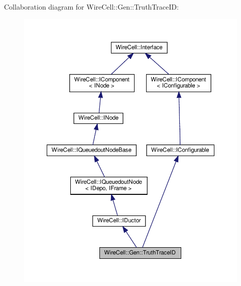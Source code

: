 Collaboration diagram for Wire\+Cell\+:\+:Gen\+:\+:Truth\+Trace\+ID\+:
\nopagebreak
\begin{figure}[H]
\begin{center}
\leavevmode
\includegraphics[width=350pt]{class_wire_cell_1_1_gen_1_1_truth_trace_i_d__coll__graph}
\end{center}
\end{figure}
